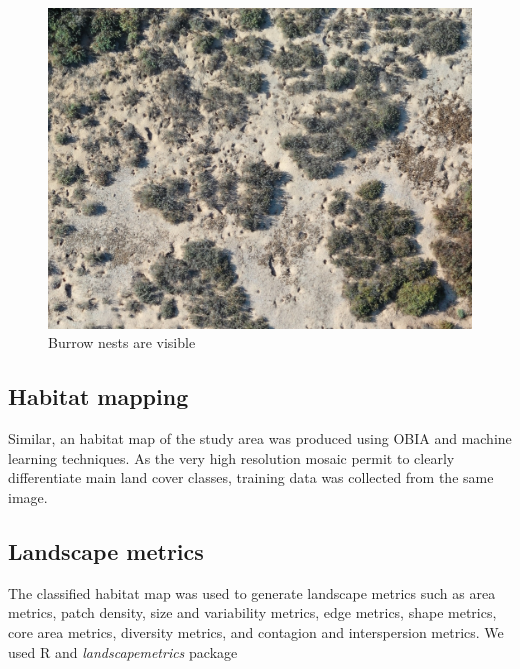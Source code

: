 \documentclass[12pt]{article}
\begin{document}
\begin{figure}[H]
	\caption{Burrow nests are visible}
	\centering
	\includegraphics[width=1\textwidth]{clipped_birds_mosaic}
\end{figure}



\subsection{Habitat mapping}

Similar, an habitat map of the study area was produced using OBIA and machine learning techniques. As the very high resolution mosaic permit to clearly differentiate main land cover classes, training data was collected from the same image. 

\subsection{Landscape metrics}

The classified habitat map was used to generate landscape metrics such as area metrics, patch density, size and variability metrics, edge metrics, shape metrics, core area metrics, diversity metrics, and contagion and interspersion metrics. We used \textsf{R} \cite{R_2021} and  \textit{landscapemetrics} package \cite{landscapemetrics_2019}
\end{document}
